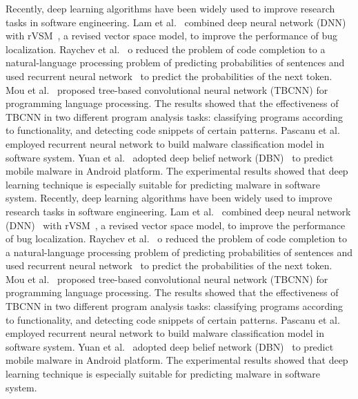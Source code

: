 Recently, deep learning algorithms have been widely used to improve research tasks in software engineering. Lam et al.~\cite{lam2015combining} combined deep neural network (DNN)~\cite{hecht1988theory} with rVSM~\cite{zhou2012should}, a revised vector space model, to improve the performance of bug localization. Raychev et al.~\cite{raychev2014code} o reduced the problem of code completion to a natural-language processing problem of predicting probabilities of sentences and used recurrent neural network~\cite{mikolov2010recurrent} to predict the probabilities of the next token. Mou et al.~\cite{mou2014tbcnn} proposed tree-based convolutional neural network (TBCNN) for programming language processing. The results showed that the effectiveness of TBCNN  in two different program analysis tasks: classifying programs according to functionality, and detecting code snippets of certain patterns. Pascanu et al.~\cite{pascanu2015malware} employed recurrent neural network to build malware classification model in software system. Yuan et al.~\cite{yuan2014droid} adopted deep belief network (DBN)~\cite{hinton2009deep} to predict mobile malware in Android platform. The experimental results showed that deep learning technique is especially suitable for predicting malware in software system. 
Recently, deep learning algorithms have been widely used to improve research tasks in software engineering. Lam et al.~\cite{lam2015combining} combined deep neural network (DNN)~\cite{hecht1988theory} with rVSM~\cite{zhou2012should}, a revised vector space model, to improve the performance of bug localization. Raychev et al.~\cite{raychev2014code} o reduced the problem of code completion to a natural-language processing problem of predicting probabilities of sentences and used recurrent neural network~\cite{mikolov2010recurrent} to predict the probabilities of the next token. Mou et al.~\cite{mou2014tbcnn} proposed tree-based convolutional neural network (TBCNN) for programming language processing. The results showed that the effectiveness of TBCNN  in two different program analysis tasks: classifying programs according to functionality, and detecting code snippets of certain patterns. Pascanu et al.~\cite{pascanu2015malware} employed recurrent neural network to build malware classification model in software system. Yuan et al.~\cite{yuan2014droid} adopted deep belief network (DBN)~\cite{hinton2009deep} to predict mobile malware in Android platform. The experimental results showed that deep learning technique is especially suitable for predicting malware in software system. 

